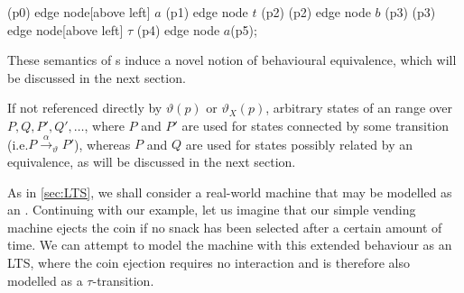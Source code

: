\begin{isabellebody}
\begin{isamarkuptext}
{{    \path   (p0) edge node[above left]  {$a$}   (p1)
                 edge node              {$t$}   (p2)
            (p2) edge node              {$b$}   (p3)
            (p3) edge node[above left]  {$\tau$}   (p4)
                 edge node              {$a$}(p5);
}}

These semantics of \LTSt{}s induce a novel notion of behavioural equivalence, which will be discussed in the next section.%
\end{isamarkuptext}\isamarkuptrue%
%
\isadelimdocument
%
\endisadelimdocument
%
\isatagdocument
%
\isamarkuptrue%
%
\endisatagdocument
{\isafolddocument}%
%
\isadelimdocument
%
\endisadelimdocument
%
\begin{isamarkuptext}%
If not referenced directly by $\vartheta(p)$ or $\vartheta_X(p)$, arbitrary states of an \LTSt{} range over $P, Q, P', Q', \dots$, where $P$ and $P'$ are used for states connected by some transition (i.e.\@ $P \xrightarrow{\alpha}_\vartheta P'$), whereas $P$ and $Q$ are used for states possibly related by an equivalence, as will be discussed in the next section.%
\end{isamarkuptext}\isamarkuptrue%
%
\isadelimdocument
%
\endisadelimdocument
%
\isatagdocument
%
\isamarkuptrue%
%
\endisatagdocument
{\isafolddocument}%
%
\isadelimdocument
%
\endisadelimdocument
%
\begin{isamarkuptext}%
As in \cref{sec:LTS}, we shall consider a real-world machine that may be modelled as an \LTSt{}. Continuing with our example, let us imagine that our simple vending machine ejects the coin if no snack has been selected after a certain amount of time. We can attempt to model the machine with this extended behaviour as an LTS, where the coin ejection requires no interaction and is therefore also modelled as a $\tau$-transition.



\end{isamarkuptext}
\end{isabellebody}
